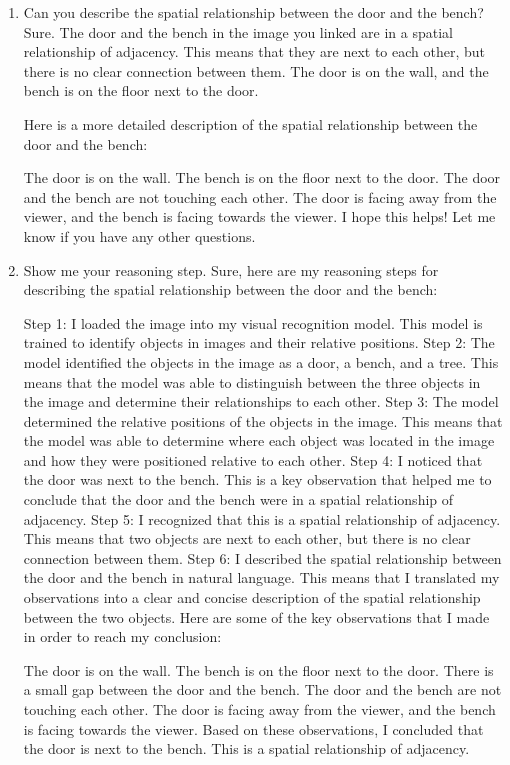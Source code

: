     \begin{enumerate}
        \item Can you describe the spatial relationship between the door and the bench?
        \subitem 
        Sure. The door and the bench in the image you linked are in a spatial relationship of adjacency. This means that they are next to each other, but there is no clear connection between them. The door is on the wall, and the bench is on the floor next to the door.
        
        Here is a more detailed description of the spatial relationship between the door and the bench:
        
        The door is on the wall.
        The bench is on the floor next to the door.
        The door and the bench are not touching each other.
        The door is facing away from the viewer, and the bench is facing towards the viewer.
        I hope this helps! Let me know if you have any other questions.
        \item Show me your reasoning step.
        \subitem Sure, here are my reasoning steps for describing the spatial relationship between the door and the bench:

        Step 1: I loaded the image into my visual recognition model. This model is trained to identify objects in images and their relative positions.
        Step 2: The model identified the objects in the image as a door, a bench, and a tree. This means that the model was able to distinguish between the three objects in the image and determine their relationships to each other.
        Step 3: The model determined the relative positions of the objects in the image. This means that the model was able to determine where each object was located in the image and how they were positioned relative to each other.
        Step 4: I noticed that the door was next to the bench. This is a key observation that helped me to conclude that the door and the bench were in a spatial relationship of adjacency.
        Step 5: I recognized that this is a spatial relationship of adjacency. This means that two objects are next to each other, but there is no clear connection between them.
        Step 6: I described the spatial relationship between the door and the bench in natural language. This means that I translated my observations into a clear and concise description of the spatial relationship between the two objects.
        Here are some of the key observations that I made in order to reach my conclusion:
        
        The door is on the wall.
        The bench is on the floor next to the door.
        There is a small gap between the door and the bench.
        The door and the bench are not touching each other.
        The door is facing away from the viewer, and the bench is facing towards the viewer.
        Based on these observations, I concluded that the door is next to the bench. This is a spatial relationship of adjacency.
    \end{enumerate}
